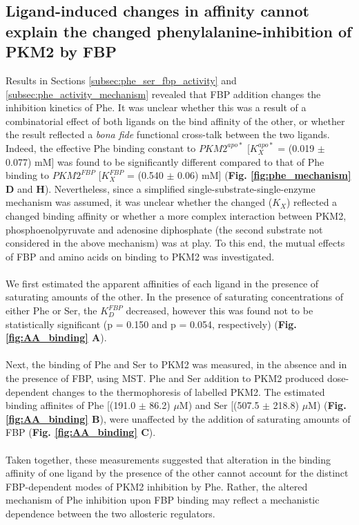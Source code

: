 \subsection{Ligand-induced changes in affinity cannot explain the changed phenylalanine-inhibition of PKM2 by FBP}
Results in Sections \ref{subsec:phe_ser_fbp_activity} and \ref{subsec:phe_activity_mechanism} revealed that FBP addition changes the inhibition kinetics of Phe. It was unclear whether this was a result of a combinatorial effect of both ligands on the bind affinity of the other, or whether the result reflected a \textit{bona fide} functional cross-talk between the two ligands. Indeed, the effective Phe binding constant to $PKM2^{apo \ast}$ [$K_{X}^{apo \ast}$ = (0.019 $\pm$ 0.077)  mM] was found to be significantly different compared to that of Phe binding to $PKM2^{FBP}$ [$K_{X}^{FBP}$ = (0.540 $\pm$ 0.06)  mM] (\textbf{Fig. \ref{fig:phe_mechanism} D} and \textbf{H}). Nevertheless, since a simplified single-substrate-single-enzyme mechanism was assumed, it was unclear whether the changed ($K_{X}$) reflected a changed binding affinity or whether a more complex interaction between PKM2, phosphoenolpyruvate and adenosine diphosphate (the second substrate not considered in the above mechanism) was at play. To this end, the mutual effects of FBP and amino acids on binding to PKM2 was investigated. 
%
%
\\\\
%
%
We first estimated the apparent affinities of each ligand in the presence of saturating amounts of the other. In the presence of saturating concentrations of either Phe or Ser, the $K_D^{FBP}$ decreased, however this was found not to be statistically significant (p = 0.150 and p = 0.054, respectively) (\textbf{Fig. \ref{fig:AA_binding} A}).
%
\\\\
%
Next, the binding of Phe and Ser to PKM2 was measured, in the absence and in the presence of FBP, using MST. Phe and Ser addition to PKM2 produced dose-dependent changes to the thermophoresis of labelled PKM2. The estimated binding affinites of Phe [(191.0 $\pm$ 86.2) $\mu$M) and Ser [(507.5 $\pm$ 218.8) $\mu$M) (\textbf{Fig. \ref{fig:AA_binding} B}), were unaffected by the addition of saturating amounts of FBP (\textbf{Fig. \ref{fig:AA_binding} C}).
%
%
\\\\
%
%
Taken together, these measurements suggested that alteration in the binding affinity of one ligand by the presence of the other cannot account for the distinct FBP-dependent modes of PKM2 inhibition by Phe. Rather, the altered mechanism of Phe inhibition upon FBP binding may reflect a mechanistic dependence between the two allosteric regulators.

